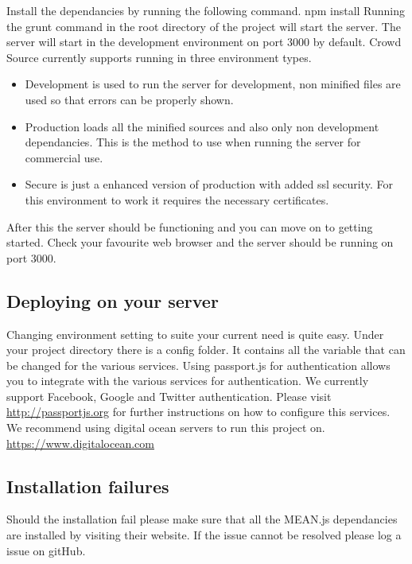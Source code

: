\newline
Install the dependancies by running the following command.
\newline
npm install
\newline
Running the grunt command in the root directory of the project will start the server. The server will start in the development environment on port 3000 by default. Crowd Source currently supports running in three environment types.
\begin{itemize}
	\item{Development} is used to run the server for development, non minified files are used so that errors can be properly shown.
	\item{Production} loads all the minified sources and also only non development dependancies. This is the method to use when running the server for commercial use.
	\item{Secure} is just a enhanced version of production with added ssl security. For this environment to work it requires the necessary certificates.
\end{itemize}
After this the server should be functioning and you can move on to getting started. Check your favourite web browser and the server should be running on port 3000.
\subsection{Deploying on your server}
Changing environment setting to suite your current need is quite easy. Under your project directory there is a config folder. It contains all the variable that can be changed for the various services. Using passport.js for authentication allows you to integrate with the various services for authentication. We currently support Facebook, Google and Twitter authentication. Please visit \url{http://passportjs.org} for further instructions on how to configure this services. We recommend using digital ocean servers to run this project on. \url{https://www.digitalocean.com}

\subsection{Installation failures}
Should the installation fail please make sure that all the MEAN.js dependancies are installed by visiting their website. If the issue cannot be resolved please log a issue on gitHub.